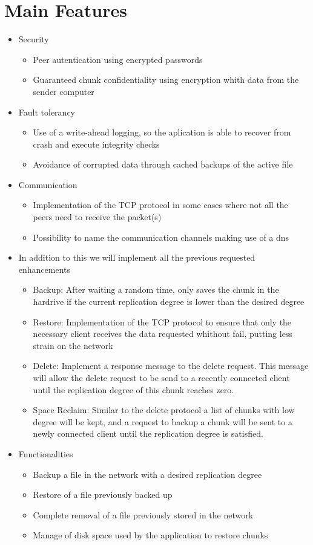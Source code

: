 \documentclass[a4paper]{article}
\begin{document}
\section{Main Features}

\begin{itemize}
\item Security
\begin{itemize}
\item Peer autentication using encrypted passwords
\item Guaranteed chunk confidentiality using encryption whith data from the sender computer
\end{itemize}
\item Fault tolerancy
\begin{itemize}
\item Use of a write-ahead logging, so the aplication is able to recover from crash and execute integrity checks
\item Avoidance of corrupted data through cached backups of the active file
\end{itemize}
\item Communication
\begin{itemize}
\item Implementation of the TCP protocol in some cases where not all the peers need to receive the packet(s)
\item Possibility to name the communication channels making use of a dns
\end{itemize}
\item In addition to this we will implement all the previous requested enhancements
\begin{itemize}
\item Backup: After waiting a random time, only saves the chunk in the hardrive if the current replication degree is lower than the desired degree
\item Restore: Implementation of the TCP protocol to ensure that only the necessary client receives the data requested whithout fail, putting less strain on the network
\item Delete: Implement a response message to the delete request. This message will allow the delete request to be send to a recently connected client until the replication degree of this chunk reaches zero.
\item Space Reclaim: Similar to the delete protocol a list of chunks with low degree will be kept, and a request to backup a chunk will be sent to a newly connected client until the replication degree is satisfied.
\end{itemize}
\item Functionalities
\begin{itemize}
\item Backup a file in the network with a desired replication degree
\item Restore of a file previously backed up
\item Complete removal of a file previously stored in the network
\item Manage of disk space used by the application to restore chunks
\end{itemize}
\end{itemize}
\end{document}
